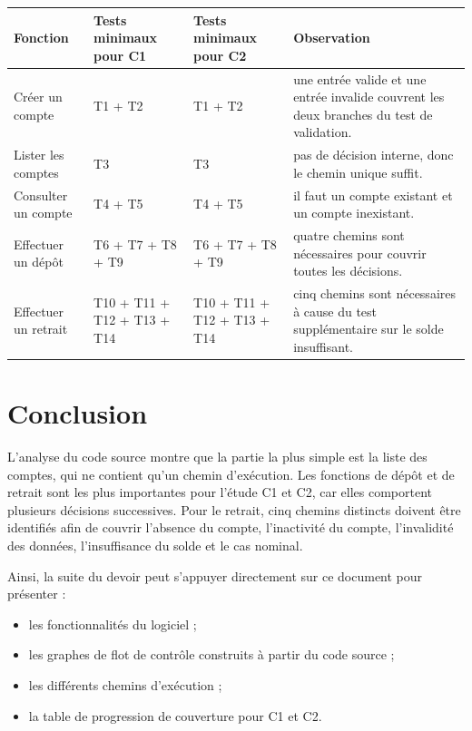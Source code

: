 \documentclass[11pt,a4paper]{article}
\begin{document}
\begin{longtable}{|P{4.2cm}|P{3.8cm}|P{3.8cm}|P{4.8cm}|}
\hline
{}
\textbf{Fonction} & \textbf{Tests minimaux pour C1} & \textbf{Tests minimaux pour C2} & \textbf{Observation} \\
\hline
Créer un compte & T1 + T2 & T1 + T2 & une entrée valide et une entrée invalide couvrent les deux branches du test de validation. \\
\hline
Lister les comptes & T3 & T3 & pas de décision interne, donc le chemin unique suffit. \\
\hline
Consulter un compte & T4 + T5 & T4 + T5 & il faut un compte existant et un compte inexistant. \\
\hline
Effectuer un dépôt & T6 + T7 + T8 + T9 & T6 + T7 + T8 + T9 & quatre chemins sont nécessaires pour couvrir toutes les décisions. \\
\hline
Effectuer un retrait & T10 + T11 + T12 + T13 + T14 & T10 + T11 + T12 + T13 + T14 & cinq chemins sont nécessaires à cause du test supplémentaire sur le solde insuffisant. \\
\hline
\end{longtable}

\section{Conclusion}

L'analyse du code source montre que la partie la plus simple est la liste des comptes, qui ne contient qu'un chemin d'exécution. Les fonctions de dépôt et de retrait sont les plus importantes pour l'étude C1 et C2, car elles comportent plusieurs décisions successives. Pour le retrait, cinq chemins distincts doivent être identifiés afin de couvrir l'absence du compte, l'inactivité du compte, l'invalidité des données, l'insuffisance du solde et le cas nominal.

Ainsi, la suite du devoir peut s'appuyer directement sur ce document pour présenter :
\begin{itemize}[leftmargin=1cm]
    \item les fonctionnalités du logiciel ;
    \item les graphes de flot de contrôle construits à partir du code source ;
    \item les différents chemins d'exécution ;
    \item la table de progression de couverture pour C1 et C2.
\end{itemize}
\end{document}
